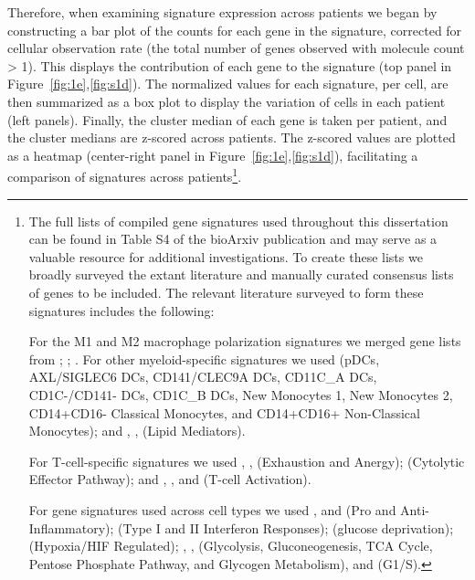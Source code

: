 Therefore, when examining signature expression across patients we began by constructing a bar plot of the counts for each gene in the signature, corrected for cellular observation rate (the total number of genes observed with molecule count \textgreater{} 1).
This displays the contribution of each gene to the signature (top panel in Figure~\ref{fig:1e},\ref{fig:s1d}).
The normalized values for each signature, per cell, are then summarized as a box plot to display the variation of cells in each patient (left panels).
Finally, the cluster median of each gene is taken per patient, and the cluster medians are z-scored across patients.
The z-scored values are plotted as a heatmap (center-right panel in Figure~\ref{fig:1e},\ref{fig:s1d}), facilitating a comparison of signatures across patients\footnote{The full lists of compiled gene signatures used throughout this dissertation can be found in Table S4 of the bioArxiv publication and may serve as a valuable resource for additional investigations. %
To create these lists we broadly surveyed the extant literature and manually curated consensus lists of genes to be included.
The relevant literature surveyed to form these signatures includes the following:

For the M1 and M2 macrophage polarization signatures we merged gene lists from \citep{Sica2012}; \citep{Biswas2010}; \citep{Bronte2016} \citep{Ugel2015} \citep{Gabrilovich2017}.
For other myeloid-specific signatures we used \citep{Villani2017} (pDCs, AXL/SIGLEC6 DCs, CD141/CLEC9A DCs, CD11C\_A DCs, CD1C-/CD141- DCs, CD1C\_B DCs, New Monocytes 1, New Monocytes 2, CD14+CD16- Classical Monocytes, and CD14+CD16+ Non-Classical Monocytes); and \citep{Gesta2007}, \citep{Perera2006}, \citep{Farmer2006,Lefterova2009} (Lipid Mediators).

For T-cell-specific signatures we used \citep{Wherry2015}, \citep{Wherry2011}, \citep{Schietinger2012} (Exhaustion and Anergy); \citep{Glimcher2004} (Cytolytic Effector Pathway); and \citep{Smith-Garvin2009}, \citep{Chtanova2005}, and \citep{AdamBest2013} (T-cell Activation).

For gene signatures used across cell types we used \citep{Mantovani2008}, and \citep{Grivennikov2010} (Pro and Anti-Inflammatory); \citep{Platanias2005} (Type I and II Interferon Responses); \citep{Ho2015} (glucose deprivation); \citep{Benita2009,Makino2003} (Hypoxia/HIF Regulated); \citep{Moreno-Sanchez2009}, \citep{Caton2010,Funes2007,Mues2009}, \citep{Beale2007} (Glycolysis, Gluconeogenesis, TCA Cycle, Pentose Phosphate Pathway, and Glycogen Metabolism), and \citep{Whitfield2002} (G1/S).}.



